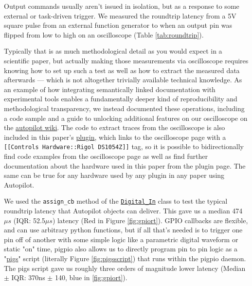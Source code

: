 Output commands usually aren't issued in isolation, but as a response to some external or task-driven trigger. We measured the roundtrip latency from a 5V square pulse from an external function generator to when an output pin was flipped from low to high on an oscilloscope (Table \ref{tab:roundtrip}). 

Typically that is as much methodological detail as you would expect in a scientific paper, but actually making those measurements via oscilloscope requires knowing how to set up such a test as well as how to extract the measured data afterwards --- which is not altogether trivially available technical knowledge. As an example of how integrating semantically linked documentation with experimental tools enables a fundamentally deeper kind of reproducibility and methodological transparency, we instead documented these operations, including a code sample and a guide to unlocking additional features on our oscilloscope on the \href{https://wiki.auto-pi-lot.com/index.php/Rigol\_DS1054Z}{autopilot wiki}. The code to extract traces from the oscilloscope is also included in this paper's \href{https://wiki.auto-pi-lot.com/index.php/Plugin:Autopilot\_Paper}{plugin}, which links to the oscilloscope page with a \texttt{[[Controls Hardware::Rigol DS1054Z]]} tag, so it is possible to bidirectionally find code examples from the oscilloscope page as well as find further documentation about the hardware used in this paper from the plugin page. The same can be true for any hardware used by any plugin in any paper using Autopilot.

We used the \texttt{assign\_cb} method of the \href{https://docs.auto-pi-lot.com/en/latest/hardware/gpio.html\#autopilot.hardware.gpio.Digital_In.assign_cb}{\texttt{Digital\_In}} class to test the typical roundtrip latency that Autopilot objects can deliver. This gave us a median 474 $\mu s$ (IQR: 52.5$\mu s$) latency (Red in Figure \ref{fig:gpiort}). GPIO callbacks are flexible, and can use arbitrary python functions, but if all that's needed is to trigger one pin off of another with some simple logic like a parametric digital waveform or static "on" time, pigpio also allows us to directly program pin to pin logic as a "\href{http://abyz.me.uk/rpi/pigpio/pigs.html}{pigs}" script (literally Figure \ref{fig:pigsscript}) that runs within the pigpio daemon. The pigs script gave us roughly three orders of magnitude lower latency (Median $\pm$ IQR: 370ns $\pm$ 140, blue in \ref{fig:gpiort}). 

